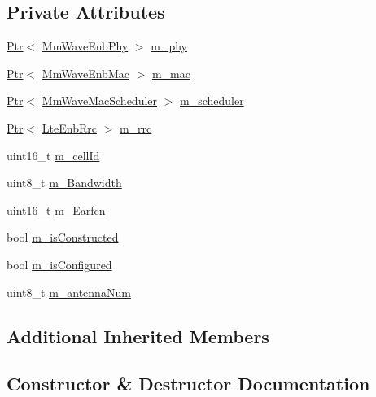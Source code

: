 \subsection*{Private Attributes}
\begin{DoxyCompactItemize}
\item 
\hyperlink{classns3_1_1Ptr}{Ptr}$<$ \hyperlink{classns3_1_1MmWaveEnbPhy}{Mm\+Wave\+Enb\+Phy} $>$ \hyperlink{classns3_1_1MmWaveEnbNetDevice_a42098011e0d238752d0ad74d1bcb17f6}{m\+\_\+phy}
\item 
\hyperlink{classns3_1_1Ptr}{Ptr}$<$ \hyperlink{classns3_1_1MmWaveEnbMac}{Mm\+Wave\+Enb\+Mac} $>$ \hyperlink{classns3_1_1MmWaveEnbNetDevice_aa22ebc9e167c4ee06fbfcb5a1cdf96ad}{m\+\_\+mac}
\item 
\hyperlink{classns3_1_1Ptr}{Ptr}$<$ \hyperlink{classns3_1_1MmWaveMacScheduler}{Mm\+Wave\+Mac\+Scheduler} $>$ \hyperlink{classns3_1_1MmWaveEnbNetDevice_a7308e79d47671caa554ac88aaf6603de}{m\+\_\+scheduler}
\item 
\hyperlink{classns3_1_1Ptr}{Ptr}$<$ \hyperlink{classns3_1_1LteEnbRrc}{Lte\+Enb\+Rrc} $>$ \hyperlink{classns3_1_1MmWaveEnbNetDevice_ab2f138e7fc0b009e2e2876e271d9a3a4}{m\+\_\+rrc}
\item 
uint16\+\_\+t \hyperlink{classns3_1_1MmWaveEnbNetDevice_a84cb34f545e2556103e9a226e1ae9c3d}{m\+\_\+cell\+Id}
\item 
uint8\+\_\+t \hyperlink{classns3_1_1MmWaveEnbNetDevice_a8f3aef7e635063420de34477e13aca20}{m\+\_\+\+Bandwidth}
\item 
uint16\+\_\+t \hyperlink{classns3_1_1MmWaveEnbNetDevice_a5b2870f793324ce95f270cb54de05152}{m\+\_\+\+Earfcn}
\item 
bool \hyperlink{classns3_1_1MmWaveEnbNetDevice_a9811387a958dedb65e829bd3a45990be}{m\+\_\+is\+Constructed}
\item 
bool \hyperlink{classns3_1_1MmWaveEnbNetDevice_a28db18384af32733f8246ad1cb40d2d9}{m\+\_\+is\+Configured}
\item 
uint8\+\_\+t \hyperlink{classns3_1_1MmWaveEnbNetDevice_a324b4303c76e329a41ffd4c9bde28cc2}{m\+\_\+antenna\+Num}
\end{DoxyCompactItemize}
\subsection*{Additional Inherited Members}


\subsection{Constructor \& Destructor Documentation}
